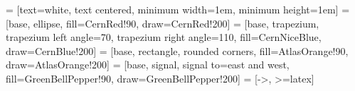 \makeatletter
\newcommand{\inlineparagraph}{\@startsection{paragraph}{4}{\z@}%
  {-3.25ex \@plus -1ex \@minus -0.2ex}%
  {-1.2pt}%
  {}%
}

\newcommand{\noskipparagraph}{\@startsection{paragraph}{4}{\z@}%
  {-3.25ex \@plus -1ex \@minus -0.2ex}%
  {0.0001px}%
  {\scshape}%
}

\newcommand{\smallskipparagraph}{\@startsection{paragraph}{4}{\z@}%
  {-3.25ex \@plus -1ex \@minus -0.2ex}%
  {5px}%
  {\scshape}%
}
\makeatother

\newcommand{\ilparagraph}[1]{\inlineparagraph{\bfseries #1\textcolor{cern}{.}}}


\makeatletter
\newcommand{\myparagraph}[1]{%
  \smallskipparagraph{\bfseries #1}%
  \refstepcounter{myparagraphlink}%
  \def\cref@currentlabel{[myparagraphlink][\arabic{myparagraphlink}][]#1}%
  \def\@currentlabelname{#1}%
}
\makeatother

\newlength{\figurewidth}
\setlength{\figurewidth}{\linewidth}

\newlength{\subfigurewidth}
\setlength{\subfigurewidth}{0.5\textwidth}

\newcommand{\tstack}[2]{$\substack{\text{\normalsize #1}\\\text{\tiny #2}}$} %

\newcommand{\mytopmargin}[1]{\newgeometry{top=3cm}#1\restoregeometry}
\newcommand{\tinytopmargin}[1]{\newgeometry{top=1cm}#1\restoregeometry}

\newcommand{\tmpcapskip}[1]{
    \setlength{\abovecaptionskip}{5pt}
    \setlength{\belowcaptionskip}{5pt}
    #1
    \setlength{\abovecaptionskip}{10pt}
    \setlength{\belowcaptionskip}{0pt}
}



\usetikzlibrary{arrows, shapes, calc, positioning}
 = [text=white, text centered, minimum width=1em, minimum height=1em]
 = [base, ellipse, fill=CernRed!90, draw=CernRed!200]
 = [base, trapezium, trapezium left angle=70, trapezium right angle=110, fill=CernNiceBlue, draw=CernBlue!200]
 = [base, rectangle, rounded corners, fill=AtlasOrange!90, draw=AtlasOrange!200]
 = [base, signal, signal to=east and west, fill=GreenBellPepper!90, draw=GreenBellPepper!200]
 = [->, >=latex]

